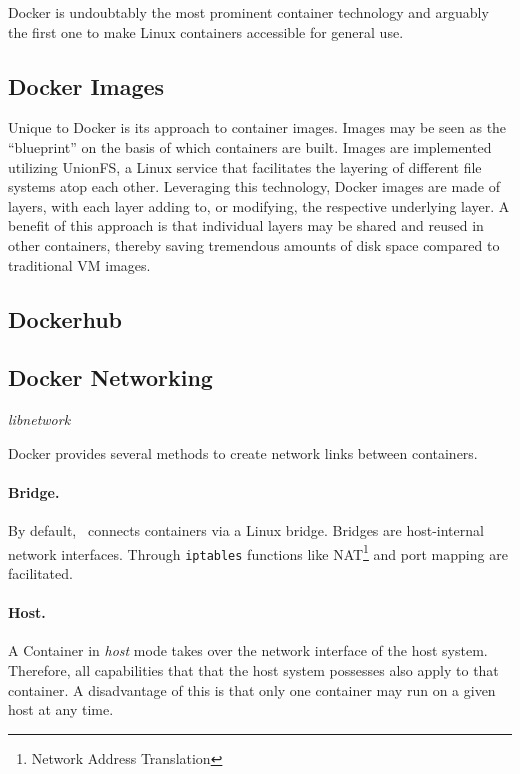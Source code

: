Docker \cite{DockerWebsite} is undoubtably the most prominent container technology and arguably the first one to make Linux containers accessible for general use. 

\subsection{Docker Images}
Unique to Docker is its approach to container images. Images may be seen as the ``blueprint'' on the basis of which containers are built. 
Images are implemented utilizing UnionFS, a Linux service that facilitates the layering of different file systems atop each other. 
Leveraging this technology, Docker images are made of layers, with each layer adding to, or modifying, the respective underlying layer. 
A benefit of this approach is that individual layers may be shared and reused in other containers, thereby saving tremendous amounts of disk space compared to traditional VM images.

\subsection{Dockerhub}

\subsection{Docker Networking}



\emph{libnetwork}

Docker provides several methods to create network links between containers.  



\paragraph{Bridge.} By default, \docker\ connects containers via a Linux bridge. Bridges are host-internal network interfaces. Through \texttt{iptables} functions like NAT\footnote{Network Address Translation} and port mapping are facilitated.

\paragraph{Host.} A Container in \emph{host} mode takes over the network interface of the host system. Therefore, all capabilities that that the host system possesses also apply to that container. A disadvantage of this is that only one container may run on a given host at any time.

